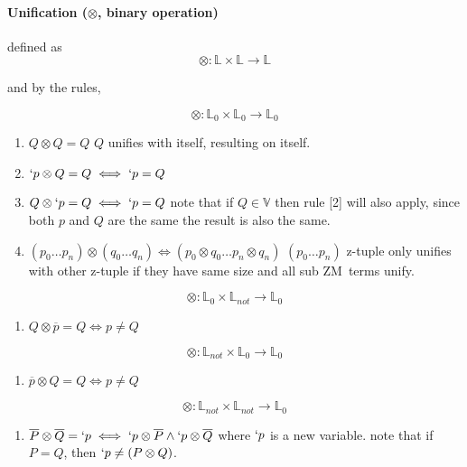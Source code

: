 \documentclass[11pt,a4paper]{report}
\newcommand{\zm}{ZM}
\newcommand{\var}[1]{`#1}
\newcommand{\unify}{\otimes}
\begin{document}
\paragraph{Unification ($\unify$, binary operation)} defined as
\[
    \unify: \mathbb{L} \times \mathbb{L} \rightarrow \mathbb{L}
\]

and by the rules,

\[
    \unify: \mathbb{L}_{0} \times \mathbb{L}_{0} \rightarrow \mathbb{L}_{0}
\]

\begin{enumerate}
\item $Q \unify Q = Q$
    \subitem $Q$ unifies with itself, resulting on itself.

\item $\var{p} \unify Q = Q \iff \var{p} = Q$
\item $Q \unify \var{p} = Q \iff \var{p} = Q$
    \subitem note that if $Q \in \mathbb{V}$ then rule [2] will also apply, since both $p$ and $Q$ are the same the result is also the same.

\item $(p_{0} \ldots p_{n}) \unify (q_{0} \ldots q_{n}) \iff (p_{0} \unify q_{0} \ldots p_{n} \unify q_{n})$
    \subitem $(p_{0} \ldots p_{n})$ z-tuple only unifies with other z-tuple if they have same size and all sub \zm\ terms unify.

\end{enumerate}


\[
    \unify: \mathbb{L}_{0} \times \mathbb{L}_{not} \rightarrow \mathbb{L}_{0}
\]

\begin{enumerate}
\item $Q \unify \overline{p} = Q \iff p \neq Q$
\end{enumerate}


\[
    \unify: \mathbb{L}_{not} \times \mathbb{L}_{0} \rightarrow \mathbb{L}_{0}
\]

\begin{enumerate}
\item $\overline{p} \unify Q = Q \iff p \neq Q$
\end{enumerate}

\[
    \unify: \mathbb{L}_{not} \times \mathbb{L}_{not} \rightarrow \mathbb{L}_{0}
\]

\begin{enumerate}
\item $\overline{P} \unify \overline{Q} = \var{p} \iff \var{p} \unify \overline{P} \wedge \var{p} \unify \overline{Q}$
    \subitem where $\var{p}$ is a new variable.
    \subitem note that if $P = Q$, then $\var{p} \neq (P \unify Q)$.
\end{enumerate}
\end{document}
